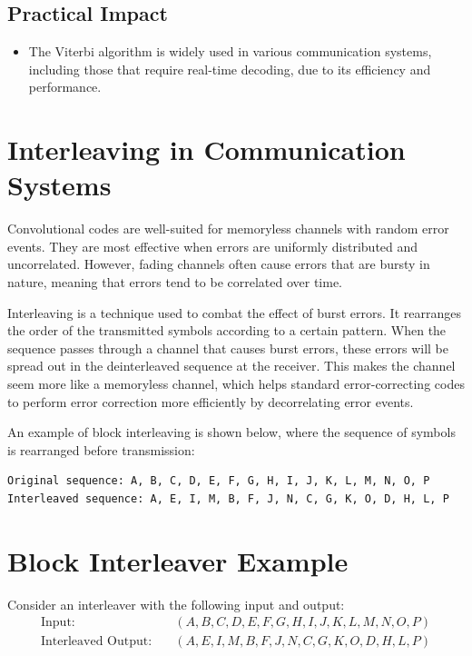 \subsection*{Practical Impact}
\begin{itemize}
  \item The Viterbi algorithm is widely used in various communication systems, including those that require real-time decoding, due to its efficiency and performance.
\end{itemize}



\section*{Interleaving in Communication Systems}

Convolutional codes are well-suited for memoryless channels with random error events. They are most effective when errors are uniformly distributed and uncorrelated. However, fading channels often cause errors that are bursty in nature, meaning that errors tend to be correlated over time. 

Interleaving is a technique used to combat the effect of burst errors. It rearranges the order of the transmitted symbols according to a certain pattern. When the sequence passes through a channel that causes burst errors, these errors will be spread out in the deinterleaved sequence at the receiver. This makes the channel seem more like a memoryless channel, which helps standard error-correcting codes to perform error correction more efficiently by decorrelating error events.

An example of block interleaving is shown below, where the sequence of symbols is rearranged before transmission:

\begin{verbatim}
Original sequence: A, B, C, D, E, F, G, H, I, J, K, L, M, N, O, P
Interleaved sequence: A, E, I, M, B, F, J, N, C, G, K, O, D, H, L, P
\end{verbatim}

\section*{Block Interleaver Example}
Consider an interleaver with the following input and output:
\begin{align*}
\text{Input:} & \quad (A,B,C,D,E,F,G,H,I,J,K,L,M,N,O,P) \\
\text{Interleaved Output:} & \quad (A,E,I,M,B,F,J,N,C,G,K,O,D,H,L,P)
\end{align*}

